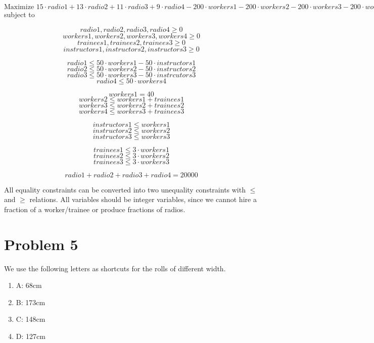 \documentclass[12pt]{article}
\begin{document}
$ \mbox{Maximize } 15 \cdot \mathit{radio1} + 13 \cdot \mathit{radio2} + 11 \cdot \mathit{radio3} + 9 \cdot \mathit{radio4} - 200 \cdot \mathit{workers1} - 200 \cdot \mathit{workers2} - 200 \cdot \mathit{workers3} - 200 \cdot \mathit{workers4} - 100 \cdot \mathit{trainees1} - 100 \cdot \mathit{trainees2} - 100 \cdot \mathit{trainees3} $ subject to

$$ \mathit{radio1}, \mathit{radio2}, \mathit{radio3}, \mathit{radio4} \geq 0 $$
$$ \mathit{workers1}, \mathit{workers2}, \mathit{workers3}, \mathit{workers4} \geq 0$$
$$ \mathit{trainees1}, \mathit{trainees2}, \mathit{trainees3} \geq 0 $$
$$ \mathit{instructors1}, \mathit{instructors2}, \mathit{instructors3} \geq 0 $$

$$ \mathit{radio1} \leq 50 \cdot \mathit{workers1} - 50 \cdot \mathit{instructors1} $$
$$ \mathit{radio2} \leq 50 \cdot \mathit{workers2} - 50 \cdot \mathit{instructors2} $$
$$ \mathit{radio3} \leq 50 \cdot \mathit{workers3} - 50 \cdot \mathit{instrcutors3} $$
$$ \mathit{radio4} \leq 50 \cdot \mathit{workers4} $$

$$ \mathit{workers1} = 40 $$
$$ \mathit{workers2} \leq \mathit{workers1} + \mathit{trainees1} $$
$$ \mathit{workers3} \leq \mathit{workers2} + \mathit{trainees2} $$
$$ \mathit{workers4} \leq \mathit{workers3} + \mathit{trainees3} $$

$$ \mathit{instructors1} \leq \mathit{workers1} $$
$$ \mathit{instructors2} \leq \mathit{workers2} $$
$$ \mathit{instructors3} \leq \mathit{workers3} $$

$$ \mathit{trainees1} \leq 3 \cdot \mathit{workers1} $$
$$ \mathit{trainees2} \leq 3 \cdot \mathit{workers2} $$
$$ \mathit{trainees3} \leq 3 \cdot \mathit{workers3} $$

$$ \mathit{radio1} + \mathit{radio2} + \mathit{radio3} + \mathit{radio4} = 20000 $$

All equality constraints can be converted into two unequality constraints with $\leq$ and $\geq$ relations. All variables should be integer variables, since we cannot hire a fraction of a worker/trainee or produce fractions of radios.


\section*{Problem 5}
We use the following letters as shortcuts for the rolls of different width.

\begin{enumerate}
	\item A: 68cm
	\item B: 173cm
	\item C: 148cm
	\item D: 127cm
\end{enumerate}
\end{document}
